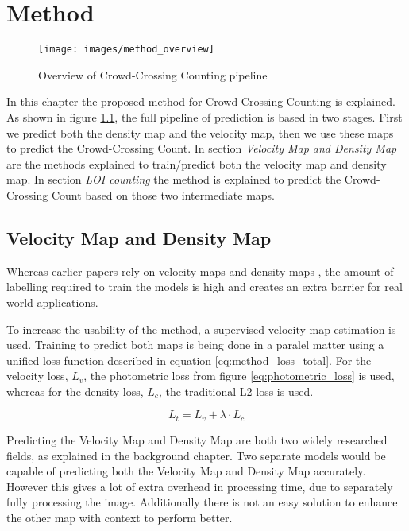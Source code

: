 \chapter{Method}

\begin{figure}[h]
\centering
\texttt{[image: images/method\_overview]}
\caption{Overview of Crowd-Crossing Counting pipeline}
\label{fig:method_overview}
\end{figure}
In this chapter the proposed method for Crowd Crossing Counting is explained. As shown in figure \ref{fig:method_overview}, the full pipeline of prediction is based in two stages. First we predict both the density map and the velocity map, then we use these maps to predict the Crowd-Crossing Count. In section \emph{Velocity Map and Density Map} are the methods explained to train/predict both the velocity map and density map. In section \emph{LOI counting} the method is explained to predict the Crowd-Crossing Count based on those two intermediate maps.

\section{Velocity Map and Density Map}
Whereas earlier papers rely on velocity maps and density maps \cite{leibe_crossing-line_2016}, the amount of labelling required to train the models is high and creates an extra barrier for real world applications.

To increase the usability of the method, a supervised velocity map estimation is used. Training to predict both maps is being done in a paralel matter using a unified loss function described in equation \ref{eq:method_loss_total}. For the velocity loss, $L_v$, the photometric loss from figure \ref{eq:photometric_loss} \cite{Yu2016, Janai2018} is used, whereas for the density loss, $L_c$, the traditional L2 loss is used.

\begin{equation}
\label{eq:method_loss_total}
	L_{t} = L_{v} + \lambda \cdot L_{c}
\end{equation}

Predicting the Velocity Map and Density Map are both two widely researched fields, as explained in the background chapter. Two separate models would be capable of predicting both the Velocity Map and Density Map accurately. However this gives a lot of extra overhead in processing time, due to separately fully processing the image. Additionally there is not an easy solution to enhance the other map with context to perform better.


